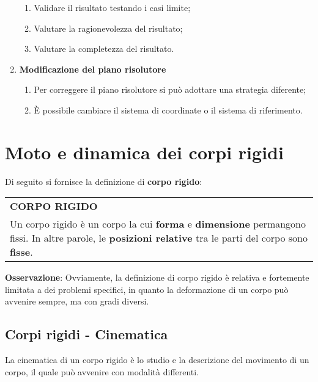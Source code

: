 \documentclass[a4paper]{extarticle}
\renewcommand\arraystretch{}
\begin{document}
\begin{enumerate}
\begin{enumerate}
    \item Validare il risultato testando i casi limite;
    \item Valutare la ragionevolezza del risultato;
    \item Valutare la completezza del risultato.
  \end{enumerate}
  \item \textbf{Modificazione del piano risolutore}
  \begin{enumerate}
    \item Per correggere il piano risolutore si può adottare una strategia diferente;
    \item È possibile cambiare il sistema di coordinate o il sistema di riferimento.
  \end{enumerate}
\end{enumerate}

\vspace{1em}
\section{Moto e dinamica dei corpi rigidi}
Di seguito si fornisce la definizione di \textbf{corpo rigido}:

\vspace{1em}
\setlength{\tabcolsep}{14pt}
\renewcommand{\arraystretch}{2}
\noindent
\begin{tabularx}{\textwidth}{@{}|P|@{}}
    \hline
    {\textbf{CORPO RIGIDO}}\\
    \parbox{\linewidth}{Un corpo rigido è un corpo la cui \textbf{forma} e \textbf{dimensione} permangono fissi. In altre parole, le \textbf{posizioni relative} tra le parti del corpo sono \textbf{fisse}.\vspace{3mm}}\\
    \hline
\end{tabularx}

\vspace{1em}
\noindent
\textbf{Osservazione}: Ovviamente, la definizione di corpo rigido è relativa e fortemente limitata a dei problemi specifici, in quanto la deformazione di un corpo può avvenire sempre, ma con gradi diversi.

\vspace{1em}
\subsection{Corpi rigidi - Cinematica}
La cinematica di un corpo rigido è lo studio e la descrizione del movimento di un corpo, il quale può avvenire con modalità differenti.
\end{document}
